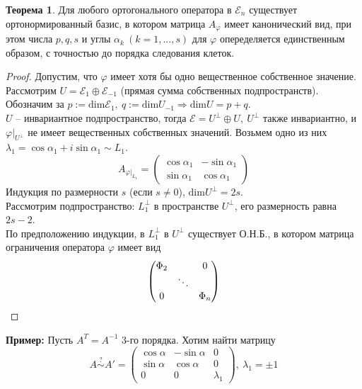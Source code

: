 \documentclass[a4paper, 12pt]{article}
\theoremstyle{definition}
\newtheorem*{theorem}{Теорема}
\begin{document}
    \begin{theorem}
        Для любого ортогонального оператора в $\mathcal{E}_n$
        существует ортонормированный базис, в котором матрица 
        $A_\varphi$ имеет канонический вид, при этом числа 
        $p,q,s$ и углы $\alpha_k\ (k=1,...,s)$ для $\varphi$
        опеределяется единственным образом, с точностью до
        порядка следования клеток.
    \end{theorem}
    \begin{proof}
        Допустим, что $\varphi$ имеет хотя бы одно 
        вещественное собственное значение. Рассмотрим $U = 
        \mathcal{E}_1 \oplus \mathcal{E}_{-1}$ (прямая сумма
        собственных подпространств). Обозначим за $p := 
        \text{dim}\mathcal{E}_1,\ q := \text{dim}U_{-1}
        \Longrightarrow \text{dim}U  = p + q$.\\
        $U$ -- инвариантное подпространство, тогда 
        $\mathcal{E} = U^\perp \oplus U,\ U^\perp $
        также инвариантно, и $\varphi|_{U^\perp}$
        не имеет вещественных собственных значений.
        Возьмем одно из них $\lambda_1 = \cos \alpha_1 + 
        i\sin \alpha_1 \sim L_1$.
        $$A_{\varphi|_{L_1}} = \begin{pmatrix}
            \cos \alpha_1 & - \sin \alpha_1\\
            \sin \alpha_1 & \cos \alpha_1
        \end{pmatrix}$$
        Индукция по размерности $s$ (если $s\neq 0$), 
        $\text{dim}U^\perp = 2s$.\\
        Рассмотрим подпространство: $L_1^\perp$ в пространстве
        $U^\perp$, его размерность равна $2s - 2$.\\
        По предположению индукции, в $L_1^\perp$ в $U^\perp$
        существует О.Н.Б., в котором матрица ограничения
        оператора $\varphi$ имеет вид
        $$\begin{pmatrix}
            \Phi_2 & \null & 0\\
            \null & \ddots & \null\\
            0 & \null & \Phi_n
        \end{pmatrix}$$
    \end{proof}
    \textbf{Пример:} Пусть $A^T = A^{-1}$ 3-го порядка.
    Хотим найти матрицу $$A \overset{?}{\sim} A' = 
    \begin{pmatrix}
        \cos \alpha & -\sin \alpha & 0\\
        \sin \alpha & \cos \alpha & 0\\
        0 & 0 & \lambda_1
    \end{pmatrix},\ \lambda_1 = \pm 1$$
\end{document}
